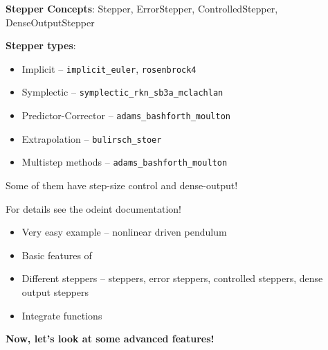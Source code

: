\begin{frame}

 \vspace{2ex}

 {\bf Stepper Concepts}: Stepper, ErrorStepper, ControlledStepper, DenseOutputStepper

 \vspace{2ex}

 {\bf Stepper types}: 
 \begin{itemize}
  \item Implicit -- {\tt implicit\_euler}, {\tt rosenbrock4}
  \item Symplectic -- {\tt symplectic\_rkn\_sb3a\_mclachlan}
  \item Predictor-Corrector -- {\tt adams\_bashforth\_moulton}
  \item Extrapolation -- {\tt bulirsch\_stoer}
  \item Multistep methods -- {\tt adams\_bashforth\_moulton}
 \end{itemize}

 \vspace{2ex}
 Some of them have step-size control and dense-output!

 \vspace{2ex}

 For details see the odeint documentation!

\end{frame}





\begin{frame}
 

 \vspace{2ex}
 \begin{itemize}
  \item Very easy example -- nonlinear driven pendulum
  \item Basic features of \odeint
  \item Different steppers -- steppers, error steppers, controlled steppers, dense output steppers
  \item Integrate functions
 \end{itemize}

 \vspace{2ex}

 \pause
 \centerline{\bf Now, let's look at some advanced features!}

\end{frame}




